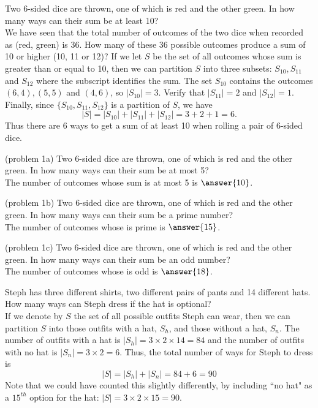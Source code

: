\documentclass[handout]{ximera}
\begin{document}
\begin{example}[example 1]
Two 6-sided dice are thrown, one of which is red and the other green.  
In how many ways can their sum be at least 10?\\
We have seen that the total number of outcomes of the two dice when 
recorded as (red, green) is 36. How many of these 36 possible outcomes produce a 
sum of 10 or higher (10, 11 or 12)? 
If we let $S$ be the set of all outcomes whose sum is greater than 
or equal to 10, then we can partition $S$ into three 
subsets: $S_{10}, S_{11}$ and $S_{12}$
where the subscript identifies the sum. 
The set $S_{10}$ contains the outcomes $(6,4), (5,5)$ and $(4,6)$, 
so $|S_{10}| =3$. Verify that $|S_{11}| =2$ and $|S_{12}| =1$.\\
Finally, since $\{S_{10}, S_{11}, S_{12}\}$ is a partition of $S$, we have
\[
|S| = |S_{10}| +|S_{11}| +|S_{12}| = 3 + 2 + 1 = 6.
\]
Thus there are 6 ways to get a sum of at least 10 when rolling a pair of 6-sided dice.
\end{example}

\begin{problem}(problem 1a)
Two 6-sided dice are thrown, one of which is red and the other green.  
In how many ways can their sum be at most 5?\\
The number of outcomes whose sum is at most 5 is $\answer{10}$.
\end{problem}

\begin{problem}(problem 1b)
Two 6-sided dice are thrown, one of which is red and the other green.  
In how many ways can their sum be a prime number?\\
The number of outcomes whose is prime is $\answer{15}$.
\end{problem}

\begin{problem}(problem 1c)
Two 6-sided dice are thrown, one of which is red and the other green.  
In how many ways can their sum be an odd number?\\
The number of outcomes whose is odd is $\answer{18}$.
\end{problem}


\begin{example}[example 2] Steph has three different shirts, 
two different pairs of pants and 14 different hats. 
How many ways can Steph dress if the hat is optional?\\
If we denote by $S$ the set of all possible outfits Steph can wear, 
then we can partition $S$ into those outfits with a hat, $S_h$, 
and those without a hat, $S_{n}$.
The number of outfits with a hat is $|S_h| = 3 \times 2 \times 14 = 84$ and 
the number of outfits with no hat is $|S_n| = 3\times 2 = 6$. 
Thus, the total number of ways for Steph to dress is 
\[
|S| = |S_h| + |S_{n}| = 84 + 6 = 90
\]
Note that we could have counted this slightly 
differently, by including ``no hat" as a $15^{th}$ option 
for the hat: $|S| = 3 \times 2 \times 15 = 90$.
\end{example}
\end{document}
